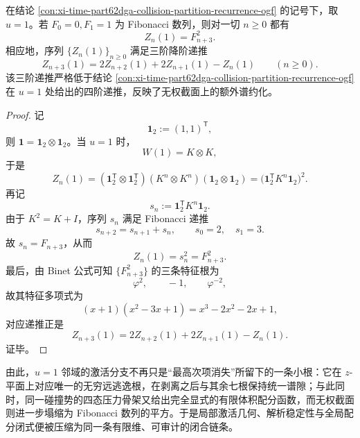 \begin{conclusion}\label{con:xi-time-part62dga-collision-partition-fibonacci-square}
在结论 \ref{con:xi-time-part62dga-collision-partition-recurrence-ogf} 的记号下，取 \(u=1\)。若 \(F_0=0,F_1=1\) 为 Fibonacci 数列，则对一切 \(n\ge 0\) 都有
\[
Z_n(1)=F_{n+3}^2.
\]
相应地，序列 \(\{Z_n(1)\}_{n\ge 0}\) 满足三阶降阶递推
\[
Z_{n+3}(1)=2Z_{n+2}(1)+2Z_{n+1}(1)-Z_n(1)
\qquad(n\ge 0).
\]
该三阶递推严格低于结论 \ref{con:xi-time-part62dga-collision-partition-recurrence-ogf} 在 \(u=1\) 处给出的四阶递推，反映了无权截面上的额外谱约化。
\end{conclusion}
\begin{proof}
记
\[
\mathbf 1_2:=(1,1)^{\mathsf T},
\]
则 \(\mathbf 1=\mathbf 1_2\otimes \mathbf 1_2\)。当 \(u=1\) 时，
\[
W(1)=K\otimes K,
\]
于是
\[
Z_n(1)
=
(\mathbf 1_2^{\mathsf T}\otimes \mathbf 1_2^{\mathsf T})
(K^n\otimes K^n)
(\mathbf 1_2\otimes \mathbf 1_2)
=
\bigl(\mathbf 1_2^{\mathsf T}K^n\mathbf 1_2\bigr)^2.
\]
再记
\[
s_n:=\mathbf 1_2^{\mathsf T}K^n\mathbf 1_2.
\]
由于 \(K^2=K+I\)，序列 \(s_n\) 满足 Fibonacci 递推
\[
s_{n+2}=s_{n+1}+s_n,
\qquad
s_0=2,\quad s_1=3.
\]
故 \(s_n=F_{n+3}\)，从而
\[
Z_n(1)=s_n^2=F_{n+3}^2.
\]
最后，由 Binet 公式可知 \(\{F_{n+3}^2\}\) 的三条特征根为
\[
\varphi^2,\qquad -1,\qquad \varphi^{-2},
\]
故其特征多项式为
\[
(x+1)(x^2-3x+1)=x^3-2x^2-2x+1,
\]
对应递推正是
\[
Z_{n+3}(1)=2Z_{n+2}(1)+2Z_{n+1}(1)-Z_n(1).
\]
证毕。
\end{proof}

\noindent
由此，\(u=1\) 邻域的激活分支不再只是“最高次项消失”所留下的一条小根：它在 \(z\)-平面上对应唯一的无穷远逃逸根，在剥离之后与其余七根保持统一谱隙；与此同时，同一碰撞势的四态压力骨架又给出完全显式的有限体积配分函数，而无权截面则进一步塌缩为 Fibonacci 数列的平方。于是局部激活几何、解析稳定性与全局配分闭式便被压缩为同一条有限维、可审计的闭合链条。

\endinput
